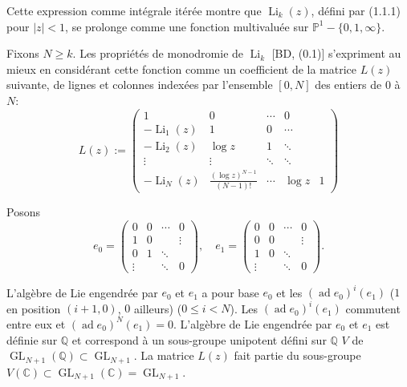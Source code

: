 \documentclass[12pt,a4paper]{article}
\theoremstyle{plain}
\theoremstyle{definition}
\theoremstyle{remark}
\DeclareMathOperator{\ad}{ad}
\newcommand{\Q}{\mathbb{Q}}
\newcommand{\C}{\mathbb{C}}
\newcommand{\IP}{\mathbb{P}}
\begin{document}
Cette expression comme int{\'e}grale it{\'e}r{\'e}e montre que $\operatorname{Li}_k(z)$, d{\'e}fini par (1.1.1) pour $|z|<1$, se prolonge comme une fonction multivalu{\'e}e sur $\IP^1-\{0,1,\infty\}$.

Fixons $N\geq k$. Les propri{\'e}t{\'e}s de monodromie de $\operatorname{Li}_k$ [BD, (0.1)] s'expriment au mieux en consid{\'e}rant cette fonction comme un coefficient de la matrice $L(z)$ suivante, de lignes et colonnes index{\'e}es par l'ensemble $[0,N]$ des entiers de $0$ {\`a} $N$:
\begin{equation}\label{eq:1.1.3}
L(z) := \begin{pmatrix}
1 & 0 & \cdots & 0\\
-\operatorname{Li}_1(z) & 1 & 0 & \cdots\\
-\operatorname{Li}_2(z) & \log z & 1 & \ddots\\
\vdots & \vdots & \ddots & \ddots\\
-\operatorname{Li}_N(z) & \frac{(\log z)^{N-1}}{(N-1)!} & \cdots & \log z & 1
\end{pmatrix}
\tag{1.1.3}
\end{equation}

Posons
\begin{equation}\label{eq:1.1.4}
e_0 = \begin{pmatrix}
0 & 0 & \cdots & 0\\
1 & 0 & & \vdots\\
0 & 1 & \ddots & \\
\vdots & & \ddots & 0
\end{pmatrix}, \quad
e_1 = \begin{pmatrix}
0 & 0 & \cdots & 0\\
0 & 0 & & \vdots\\
1 & 0 & \ddots & \\
\vdots & & \ddots & 0
\end{pmatrix}.
\tag{1.1.4}
\end{equation}

L'alg{\`e}bre de Lie engendr{\'e}e par $e_0$ et $e_1$ a pour base $e_0$ et les $(\ad e_0)^i(e_1)$ ($1$ en position $(i+1,0)$, $0$ ailleurs) ($0\leq i<N$). Les $(\ad e_0)^i(e_1)$ commutent entre eux et $(\ad e_0)^N(e_1)=0$. L'alg{\`e}bre de Lie engendr{\'e}e par $e_0$ et $e_1$ est d{\'e}finie sur $\Q$ et correspond {\`a} un sous-groupe unipotent d{\'e}fini sur $\Q$ $V$ de $\operatorname{GL}_{N+1}(\Q)\subset\operatorname{GL}_{N+1}$. La matrice $L(z)$ fait partie du sous-groupe $V(\C)\subset\operatorname{GL}_{N+1}(\C)=\operatorname{GL}_{N+1}$.
\end{document}
